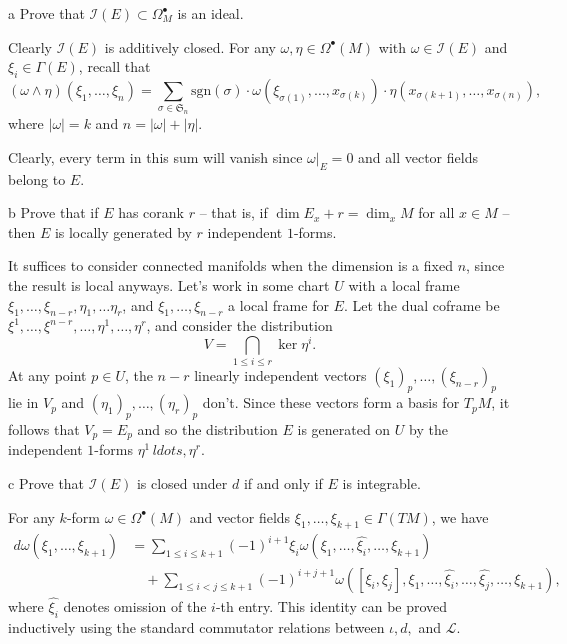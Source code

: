 \documentclass{../../templates/lkx_pset}
\begin{document}
\begin{parts}
	\begin{part}{a}
		Prove that $\mathcal{I}(E)\subset \Omega^\bullet_M$ is an ideal.
	\end{part}

	Clearly $\mathcal{I}(E)$ is additively closed. For any $\omega,\eta \in \Omega^\bullet(M)$ with $\omega\in \mathcal{I}(E)$ and $\xi_i\in \Gamma(E)$, recall that
	\[
		(\omega\wedge \eta)(\xi_1,\ldots,\xi_n) = \sum_{\sigma\in \mathfrak{S}_n} \textrm{sgn}(\sigma)\cdot \omega(\xi_{\sigma(1)},\ldots, x_{\sigma(k)})\cdot \eta(x_{\sigma(k+1)}, \ldots, x_{\sigma(n)}),
	\]
	where $|\omega|=k$ and $n=|\omega|+|\eta|$.

	Clearly, every term in this sum will vanish since $\omega|_E=0$ and all vector fields belong to $E$.

	\begin{part}{b}
		Prove that if $E$ has corank $r$ -- that is, if $\dim E_x + r =\dim_x M$ for all $x\in M$ -- then $E$ is locally generated by $r$ independent $1$-forms.
	\end{part}

	It suffices to consider connected manifolds when the dimension is a fixed $n$, since the result is local anyways. Let's work in some chart $U$ with a local frame $\xi_1, \ldots, \xi_{n-r}, \eta_1,\ldots \eta_r$, and $\xi_1,\ldots,\xi_{n-r}$ a local frame for $E$. Let the dual coframe be $\xi^1,\ldots, \xi^{n-r},\ldots, \eta^1,\ldots, \eta^r$, and consider the distribution
	\[
		V = \bigcap_{1\leq i \leq r}\ker \eta^i.
	\]
	At any point $p\in U$, the $n-r$ linearly independent vectors $(\xi_1)_p,\ldots,(\xi_{n-r})_p$ lie in $V_p$ and $(\eta_1)_p,\ldots,(\eta_r)_p$ don't. Since these vectors form a basis for $T_p M$, it follows that $V_p=E_p$ and so the distribution $E$ is generated on $U$ by the independent $1$-forms $\eta^1\,ldots,\eta^r$.

	\begin{part}{c}
		Prove that $\mathcal{I}(E)$ is closed under $d$ if and only if $E$ is integrable.
	\end{part}

	For any $k$-form $\omega\in \Omega^\bullet(M)$ and vector fields $\xi_1,\ldots,\xi_{k+1}\in \Gamma(TM)$, we have
	\[
		\begin{aligned}
			d\omega(\xi_1,\ldots,\xi_{k+1}) & = \sum_{1\leq i \leq k+1} (-1)^{i+1} \xi_i\omega(\xi_1,\ldots,\widehat{\xi_i},\ldots, \xi_{k+1})                                               \\
			                                & \quad+ \sum_{1\leq i<j\leq k+1} (-1)^{i+j+1}\omega([\xi_i, \xi_j], \xi_1, \ldots, \widehat{\xi_i},\ldots, \widehat{\xi_j}, \ldots, \xi_{k+1}),
		\end{aligned}
	\]
	where $\widehat{\xi_i}$ denotes omission of the $i$-th entry. This identity can be proved inductively using the standard commutator relations between $\iota, d,$ and $\mathcal{L}$.


\end{parts}
\end{document}
